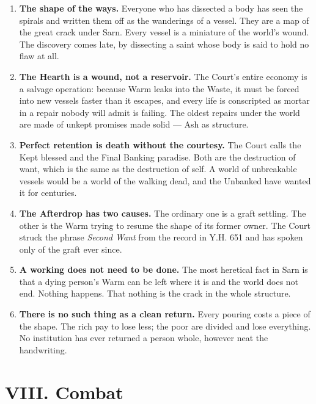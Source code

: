 \documentclass{design/chronicle}
\begin{document}
\begin{enumerate}[leftmargin=1.4em,itemsep=1pt,topsep=3pt,parsep=0pt]

\item \textbf{The shape of the ways.} Everyone who has dissected a body has seen the spirals and written them off as the wanderings of a vessel. They are a map of the great crack under Sarn. Every vessel is a miniature of the world’s wound. The discovery comes late, by dissecting a saint whose body is said to hold no flaw at all.

\item \textbf{The Hearth is a wound, not a reservoir.} The Court’s entire economy is a salvage operation: because Warm leaks into the Waste, it must be forced into new vessels faster than it escapes, and every life is conscripted as mortar in a repair nobody will admit is failing. The oldest repairs under the world are made of unkept promises made solid — Ash as structure.

\item \textbf{Perfect retention is death without the courtesy.} The Court calls the Kept blessed and the Final Banking paradise. Both are the destruction of want, which is the same as the destruction of self. A world of unbreakable vessels would be a world of the walking dead, and the Unbanked have wanted it for centuries.

\item \textbf{The Afterdrop has two causes.} The ordinary one is a graft settling. The other is the Warm trying to resume the shape of its former owner. The Court struck the phrase \emph{Second Want} from the record in Y.H. 651 and has spoken only of the graft ever since.

\item \textbf{A working does not need to be done.} The most heretical fact in Sarn is that a dying person’s Warm can be left where it is and the world does not end. Nothing happens. That nothing is the crack in the whole structure.

\item \textbf{There is no such thing as a clean return.} Every pouring costs a piece of the shape. The rich pay to lose less; the poor are divided and lose everything. No institution has ever returned a person whole, however neat the handwriting.

\end{enumerate}

\section*{VIII. Combat}
\end{document}
